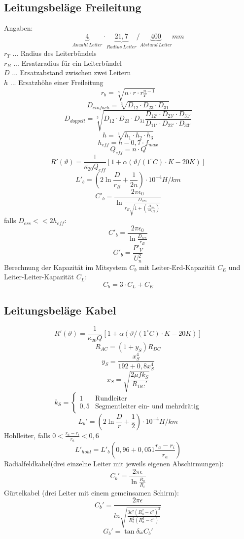 \documentclass[9pt,a4paper]{scrartcl}
\begin{document}
\begin{multicols}{3}
		\subsection{Leitungsbeläge Freileitung}
		Angaben:
		\[\underbrace{4}_{Anzahl\ Leiter} \cdot \underbrace{21,7}_{Radius\ Leiter} / \underbrace{400}_{Abstand\ Leiter} mm\]
		$r_T$ ... Radius des Leiterbündels \\
		$r_B$ ... Ersatzradius für ein Leiterbündel \\
		$D$ ... Ersatzabstand zwischen zwei Leitern \\
		$h$ ... Ersatzhöhe einer Freileitung
		\[r_b = \sqrt[n]{n \cdot r \cdot r_T^{n - 1}}\]
		\[D_{einfach} = \sqrt[3]{D_{12} \cdot D_{23} \cdot D_{31}}\]
		\[D_{doppelt} = \sqrt[3]{D_{12} \cdot D_{23} \cdot D_{31} \frac{D_{12'} \cdot D_{23'} \cdot D_{31'}}{D_{11'} \cdot D_{22'} \cdot D_{33'}}}\]
		\[h = \sqrt[3]{h_1 \cdot h_2 \cdot h_3}\]
		\[h_{eff} = h - 0,7 \cdot f_{max}\]
		\[Q_{eff} = n \cdot Q\]
		\[R'(\vartheta) = \frac{1}{\kappa_{20} Q_{eff}} \left[1 + \alpha (\vartheta/(1^\circ C) \cdot K - 20 K) \right]\]
		\[L'_b = \left( 2 \ln \frac{D}{r_B} + \frac{1}{2n} \right) \cdot 10^{-4} H/km\]
		\[C'_b = \frac{2 \pi \epsilon_0}{\ln \frac{D_{ers}}{r_B \sqrt{1 + \left(\frac{D_{ers}}{2 h_{eff}}\right)}}}\]
		falls $D_{ers} << 2h_{eff}$:
		\[C'_b = \frac{2 \pi \epsilon_0}{\ln \frac{D_{ers}}{r_B }}\]
		\[G'_b = \frac{P'_V}{U_n^2}\]
		Berechnung der Kapazität im Mitsystem $C_b$ mit Leiter-Erd-Kapazität $C_E$ und Leiter-Leiter-Kapazität $C_L$:
		\[C_b = 3 \cdot C_L + C_E\]
		
		\subsection{Leitungsbeläge Kabel}
		\[R'(\vartheta) = \frac{1}{\kappa_{20} Q} \left[1 + \alpha (\vartheta/(1^\circ C) \cdot K - 20 K) \right]\]
		\[R_{AC} = (1 + y_S) R_{DC}\]
		\[y_S = \frac{x_S^4}{192 + 0,8 x_S^4}\]
		\[x_S = \sqrt{\frac{2 \mu f k_S}{R_{DC}'}}\]
		\[k_S = \begin{cases} 1 & \text{Rundleiter} \\ 0,5 & \text{Segmentleiter ein- und mehrdrätig} \end{cases}\]
		\[L_b' = \left( 2 \ln \frac{D}{r} + \frac{1}{2} \right) \cdot 10^{-4} H/km\]
		Hohlleiter, falls $0 < \frac{r_a -r_i}{r_a} < 0,6$
		\[L'_{hohl} = L'_b (0,96 + 0,051 \frac{r_a -r_i}{r_a})\]
		Radialfeldkabel(drei einzelne Leiter mit jeweils eigenen Abschirmungen):
		\[C_b' = \frac{2 \pi \epsilon}{\ln \frac{R_a}{R_i}}\]
		Gürtelkabel (drei Leiter mit einem gemeinsamen Schirm):
		\[C_b' = \frac{2 \pi \epsilon}{ln \sqrt{\frac{3 c^2 (R_a^2 - c^2)^3}{R_i^2(R_a^6 - c^6)}}}\]
		\[G_b' = \tan \delta \omega C_b'\]
		

\end{multicols}
\end{document}
